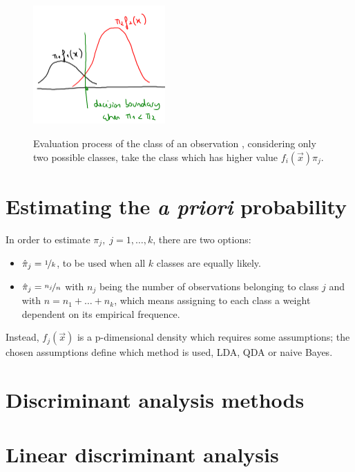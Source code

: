   \begin{figure}[H]
    \caption{Evaluation process of the class of an observation ,
    considering only two possible classes, take the class which has higher value
    $f_i(\vec{x})\pi_j$.}
    \centering
    \includegraphics[width=0.45\textwidth]{discAnalysisBoundary}
    \label{fig: Discriminant analysis decision}
    \end{figure}
  

  \section{Estimating the \textit{a priori} probability} In order to estimate
    $\pi_j, \; j=1, \dots, k$, there are two options:
    \begin{itemize}
      \item $\hat{\pi}_j = \nicefrac{1}{k}$, to be used when all $k$ classes are
      equally likely.
      \item $\hat{\pi}_j = \nicefrac{n_j}{n}$ with $n_j$ being the number of
      observations belonging to class $j$ and with $n = n_1 + \dots + n_k$,
      which means assigning to each class a weight dependent on its empirical
      frequence. 
    \end{itemize}

    Instead, $f_j(\vec{x})$ is a p-dimensional density which requires some
    assumptions; the chosen assumptions define which method is used, LDA, QDA or
    naive Bayes. 
  
  \section{Discriminant analysis methods}
    

  \section{Linear discriminant analysis}

